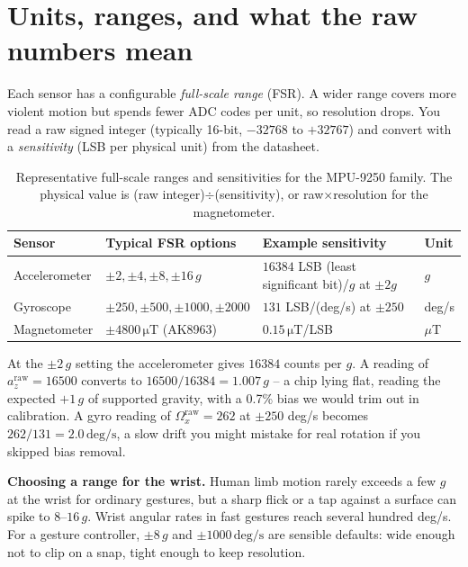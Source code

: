 \section{Units, ranges, and what the raw numbers mean}
\label{ch34:units}

Each sensor has a configurable \emph{full-scale range} (FSR). A wider range covers
more violent motion but spends fewer ADC codes per unit, so resolution drops. You read
a raw signed integer (typically 16-bit, $-32768$ to $+32767$) and convert with a
\emph{sensitivity} (LSB per physical unit) from the datasheet.

\begin{table}[H]
\centering
\renewcommand{\arraystretch}{1.2}
\begin{tabular}{@{}llll@{}}
\toprule
Sensor & Typical FSR options & Example sensitivity & Unit \\
\midrule
Accelerometer & $\pm2,\pm4,\pm8,\pm16\,g$ & $16384$ LSB (least significant bit)/$g$ at $\pm2g$ & $g$ \\
Gyroscope & $\pm250,\pm500,\pm1000,\pm2000$ & $131$ LSB/(deg/s) at $\pm250$ & deg/s \\
Magnetometer & $\pm4800\,\mathrm{\mu T}$ (AK8963) & $0.15\,\mathrm{\mu T}$/LSB & $\mu$T \\
\bottomrule
\end{tabular}
\caption{Representative full-scale ranges and sensitivities for the MPU-9250 family.
The physical value is (raw integer)$\div$(sensitivity), or raw$\times$resolution for
the magnetometer.}
\label{ch34:tab-ranges}
\end{table}

\begin{example}
\label{ch34:ex-counts}
At the $\pm2\,g$ setting the accelerometer gives $16384$ counts per $g$. A reading of
$a_z^{\text{raw}} = 16500$ converts to $16500/16384 = 1.007\,g$ -- a chip lying flat,
reading the expected $+1\,g$ of supported gravity, with a 0.7\% bias we would trim out
in calibration. A gyro reading of $\Omega_x^{\text{raw}} = 262$ at $\pm250$ deg/s
becomes $262/131 = 2.0\,\mathrm{deg/s}$, a slow drift you might mistake for real
rotation if you skipped bias removal.
\end{example}

\begin{focusbox}
\textbf{Choosing a range for the wrist.} Human limb motion rarely exceeds a few $g$ at
the wrist for ordinary gestures, but a sharp flick or a tap against a surface can spike
to $8$--$16\,g$. Wrist angular rates in fast gestures reach several hundred deg/s. For
a gesture controller, $\pm8\,g$ and $\pm1000\,\mathrm{deg/s}$ are sensible defaults:
wide enough not to clip on a snap, tight enough to keep resolution.
\end{focusbox}

